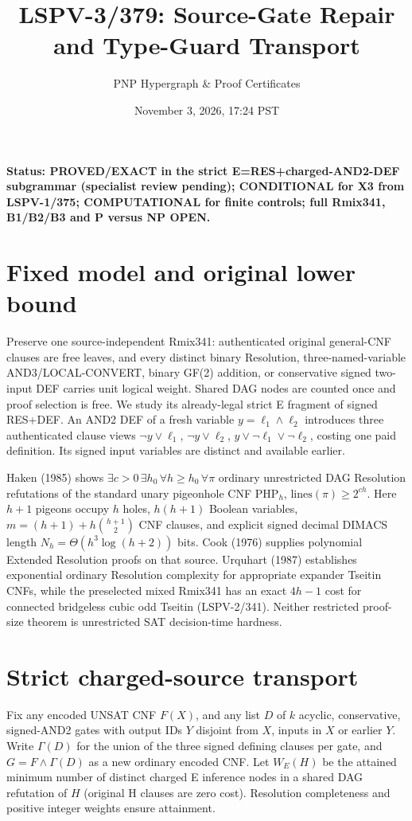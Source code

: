 \documentclass[11pt]{article}
\title{LSPV-3/379: Source-Gate Repair and Type-Guard Transport}
\author{PNP Hypergraph \& Proof Certificates}
\date{November 3, 2026, 17:24 PST}
\begin{document}
\maketitle
\noindent\textbf{Status: PROVED/EXACT in the strict E=RES+charged-AND2-DEF subgrammar (specialist review pending); CONDITIONAL for X3 from LSPV-1/375; COMPUTATIONAL for finite controls; full Rmix341, B1/B2/B3 and P versus NP OPEN.}
\section*{Fixed model and original lower bound}
Preserve one source-independent Rmix341: authenticated original general-CNF clauses are free leaves, and every distinct binary Resolution, three-named-variable AND3/LOCAL-CONVERT, binary GF(2) addition, or conservative signed two-input DEF carries unit logical weight. Shared DAG nodes are counted once and proof selection is free. We study its already-legal strict E fragment of signed RES+DEF. An AND2 DEF of a fresh variable $y=\ell_1\land\ell_2$ introduces three authenticated clause views $\neg y\lor\ell_1$, $\neg y\lor\ell_2$, $y\lor\neg\ell_1\lor\neg\ell_2$, costing one paid definition. Its signed input variables are distinct and available earlier.

Haken (1985) shows $\exists c>0\,\exists h_0\,\forall h\ge h_0\,\forall \pi$ ordinary unrestricted DAG Resolution refutations of the standard unary pigeonhole CNF $\mathrm{PHP}_h$, $\mathrm{lines}(\pi)\ge2^{ch}$. Here $h+1$ pigeons occupy $h$ holes, $h(h+1)$ Boolean variables, $m=(h+1)+h\binom{h+1}{2}$ CNF clauses, and explicit signed decimal DIMACS length $N_h=\Theta(h^3\log(h+2))$ bits. Cook (1976) supplies polynomial Extended Resolution proofs on that source. Urquhart (1987) establishes exponential ordinary Resolution complexity for appropriate expander Tseitin CNFs, while the preselected mixed Rmix341 has an exact $4h-1$ cost for connected bridgeless cubic odd Tseitin (LSPV-2/341). Neither restricted proof-size theorem is unrestricted SAT decision-time hardness.

\section*{Strict charged-source transport}
Fix any encoded UNSAT CNF $F(X)$, and any list $D$ of $k$ acyclic, conservative, signed-AND2 gates with output IDs $Y$ disjoint from $X$, inputs in $X$ or earlier $Y$. Write $\Gamma(D)$ for the union of the three signed defining clauses per gate, and $G=F\land\Gamma(D)$ as a new ordinary encoded CNF. Let $W_E(H)$ be the attained minimum number of distinct charged E inference nodes in a shared DAG refutation of $H$ (original H clauses are zero cost). Resolution completeness and positive integer weights ensure attainment.
\end{document}
